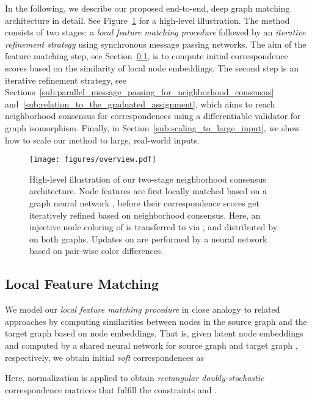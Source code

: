 \documentclass{article}
\begin{document}
In the following, we describe our proposed end-to-end, deep graph matching architecture in detail.
See Figure~\ref{fig:overview} for a high-level illustration.
The method consists of two stages: a \emph{local feature matching procedure} followed by an \emph{iterative refinement strategy} using synchronous message passing networks.
The aim of the feature matching step, see Section~\ref{sub:feature_matching}, is to compute initial correspondence scores based on the similarity of local node embeddings.
The second step is an iterative refinement strategy, see Sections~\ref{sub:parallel_message_passing_for_neighborhood_consensus} and~\ref{sub:relation_to_the_graduated_assignment}, which aims to reach neighborhood consensus for correspondences using a differentiable validator for graph isomorphism.
Finally, in Section~\ref{sub:scaling_to_large_input}, we show how to scale our method to large, real-world inputs.

\begin{figure}[t]
  \centering
  \texttt{[image: figures/overview.pdf]}
  \caption{High-level illustration of our two-stage neighborhood consensus architecture.
    Node features are first locally matched based on a graph neural network , before their correspondence scores get iteratively refined based on neighborhood consensus.
    Here, an injective node coloring of  is transferred to  via , and distributed by  on both graphs.
    Updates on  are performed by a neural network  based on pair-wise color differences.
    }\label{fig:overview}
\end{figure}

\subsection{Local Feature Matching}\label{sub:feature_matching}

We model our \emph{local feature matching procedure} in close analogy to related approaches \citep{Bai/etal/2018,Bai/etal/2019,Wang/etal/2019,Zhang/Lee/2019,Wang/Solomon/2019} by computing similarities between nodes in the source graph  and the target graph  based on node embeddings.
That is, given latent node embeddings  and  computed by a shared neural network  for source graph  and target graph , respectively, we obtain initial \emph{soft} correspondences as

Here,  normalization is applied to obtain \emph{rectangular doubly-stochastic} correspondence matrices that fulfill the constraints  and  \citep{Sinkhorn/Knopp/1967,Adams/Zemel/2011,Cour/etal/2006}.
\end{document}
